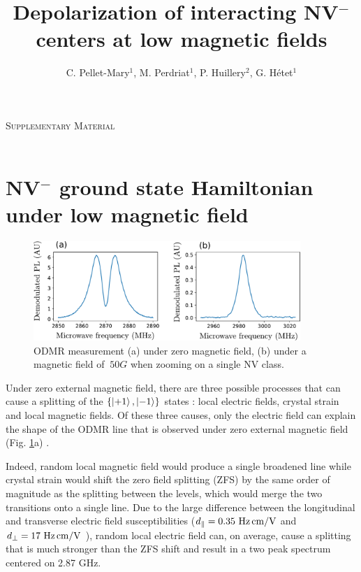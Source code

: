 \documentclass[preprintnumbers,amsmath,amssymb,onecolumn,12pt]{revtex4-2}\usepackage{graphicx}%
\begin{document}
\vspace{0.2in}
{\Large \hspace{1.6in}\textsc{Supplementary Material} }\\
\
\title{Depolarization of interacting NV$^-$ centers at low magnetic fields}

\author{C. Pellet-Mary$^1$, M. Perdriat$^1$, P. Huillery$^2$,  G. H\'etet$^1$} 


\maketitle

\tableofcontents

\section{NV$^-$ ground state Hamiltonian under low magnetic field}
\label{sec Hamiltonian}
\begin{figure}[h]
\includegraphics[width=0.9\textwidth]{Figures_SI/fig_ESR}
\caption{ODMR measurement (a) under zero magnetic field, (b) under a magnetic field of $~ 50 G$ when zooming on a single NV class.}
\label{ESR_single_spin}
\end{figure}
Under zero external magnetic field, there are three possible processes that can cause a splitting of the $\{\ket{+1},\ket{-1}\}$ states : local electric fields, crystal strain and local magnetic fields. Of these three causes, only the electric field can explain the shape of the ODMR line that is observed under zero external magnetic field (Fig. \ref{ESR_single_spin}a) \cite{mittiga2018imaging}.

Indeed, random local magnetic field would produce a single broadened line while crystal strain would shift the zero field splitting (ZFS) by the same order of magnitude as the splitting between the levels, which would merge the two transitions onto a single line. Due to the large difference between the longitudinal and transverse electric field susceptibilities ($d_\parallel = 0.35\ \rm Hz\, cm/V$ and $d_\perp = 17\ \rm Hz\, cm/V$ \cite{van1990electric}), random local electric field can, on average, cause a splitting that is much stronger than the ZFS shift and result in a two peak spectrum centered on 2.87 GHz.
\end{document}
